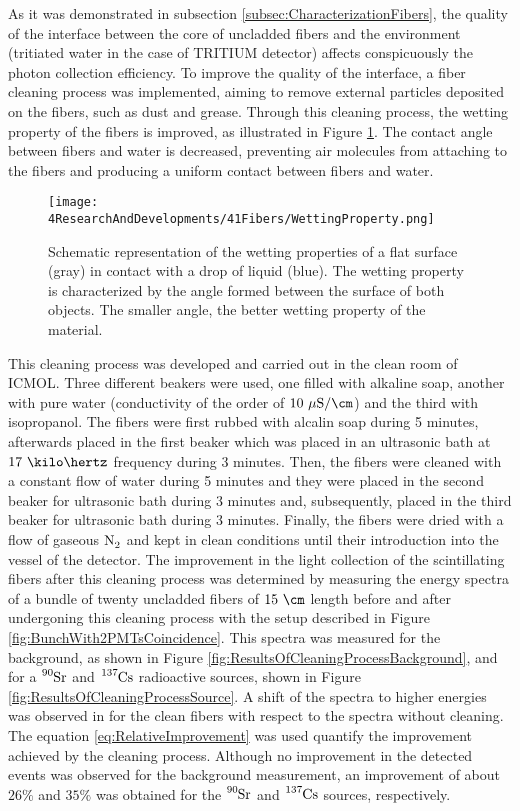 
As it was demonstrated in subsection \ref{subsec:CharacterizationFibers}, the quality of the interface between the core of uncladded fibers and the environment (tritiated water in the case of TRITIUM detector) affects conspicuously the photon collection efficiency. To improve the quality of the interface, a fiber cleaning process was implemented, aiming to remove external particles deposited on the fibers, such as dust and grease.  Through this cleaning process, the wetting property of the fibers is improved, as illustrated in Figure \ref{fig:WettingProperty}. The contact angle between fibers and water is decreased, preventing air molecules from attaching to the fibers and producing a uniform contact between fibers and water.
\begin{figure}[h]
\centering
\texttt{[image: 4ResearchAndDevelopments/41Fibers/WettingProperty.png]}
\caption{Schematic representation of the wetting properties of a flat surface (gray) in contact with a drop of liquid (blue). The wetting property is characterized by the angle formed between the surface of both objects. The smaller angle, the better wetting property of the material. \cite{WettingProperty}\label{fig:WettingProperty}}
\end{figure}
This cleaning process  was developed and carried out in the clean room of ICMOL. Three different beakers were used, one filled with alkaline soap, another with pure water (conductivity of the order of $10~\mu\text{S}/\cm$) and the third with isopropanol. The fibers were first rubbed with alcalin soap during 5 minutes, afterwards placed in the first beaker which was placed in an ultrasonic bath at $17~\kilo\hertz$ frequency during 3 minutes. Then, the fibers were cleaned with a constant flow of water during 5 minutes and they were placed in the second beaker for ultrasonic bath during 3 minutes and, subsequently, placed in the third beaker for ultrasonic bath during 3 minutes. Finally, the fibers were dried with a flow of gaseous $\ce{N_2}$ and kept in clean conditions until their introduction into the vessel of the detector. The improvement in the light collection of the scintillating fibers after this cleaning process was determined by measuring the energy spectra of a bundle of twenty uncladded fibers of $15~\cm$ length before and after undergoning this cleaning process with the setup described in Figure \ref{fig:BunchWith2PMTsCoincidence}. This spectra was measured for the background, as shown in Figure \ref{fig:ResultsOfCleaningProcessBackground}, and for a $\ce{^{90}Sr}$ and $\ce{^{137}Cs}$ radioactive sources, shown in Figure \ref{fig:ResultsOfCleaningProcessSource}. A shift of the spectra to higher energies was observed in for the clean fibers with respect to the spectra without cleaning. The equation \ref{eq:RelativeImprovement} was used  quantify the improvement achieved by the cleaning process. Although no improvement in the detected events was observed for the background measurement, an improvement of about $26\%$ and $35\%$ was obtained for the $\ce{^{90}Sr}$ and $\ce{^{137}Cs}$ sources, respectively.

